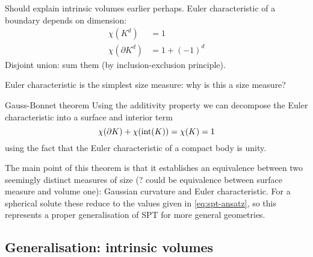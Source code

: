 Should explain intrinsic volumes earlier perhaps.
Euler characteristic of a boundary depends on dimension:
\begin{align}
  \chi(K^d) &= 1 \\
  \chi(\partial K^d) &= 1 + (-1)^d
\end{align}
Disjoint union: sum them (by inclusion-exclusion principle).

Euler characteristic is the simplest size measure: why is this a size measure?

\begin{theorem}{Gauss-Bonnet theorem}
  Using the additivity property we can decompose the Euler characteristic into a surface and interior term
  \begin{equation*}
    \chi(\partial K) + \chi( \operatorname{int}(K) ) = \chi(K) = 1
  \end{equation*}
  using the fact that the Euler characteristic of a compact body is unity.
\end{theorem}

The main point of this theorem is that it establishes an equivalence between two seemingly distinct measures of size (? could be equivalence between surface measure and volume one): Gaussian curvature and Euler characteristic.
For a spherical solute these reduce to the values given in \eqref{eq:spt-ansatz}, so this represents a proper generalisation of SPT for more general geometries.

\subsection{Generalisation: intrinsic volumes}

